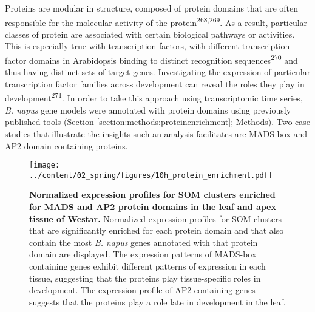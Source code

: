 \documentclass[12pt,]{book}
\begin{document}
Proteins are modular in structure, composed of protein domains that are
often responsible for the molecular activity of the
protein\textsuperscript{268,269}. As a result, particular classes of
protein are associated with certain biological pathways or activities.
This is especially true with transcription factors, with different
transcription factor domains in Arabidopsis binding to distinct
recognition sequences\textsuperscript{270} and thus having distinct sets
of target genes. Investigating the expression of particular
transcription factor families across development can reveal the roles
they play in development\textsuperscript{271}. In order to take this
approach using transcriptomic time series, \emph{B. napus} gene models
were annotated with protein domains using previously published tools
(Section \ref{section:methods:proteinenrichment}; Methods). Two case
studies that illustrate the insights such an analysis facilitates are
MADS-box and AP2 domain containing proteins.

\begin{figure}[htbp]
\centering
\texttt{[image: ../content/02\_spring/figures/10h\_protein\_enrichment.pdf]}
\caption{\textbf{Normalized expression profiles for SOM clusters
enriched for MADS and AP2 protein domains in the leaf and apex tissue of
Westar.} Normalized expression profiles for SOM clusters that are
significantly enriched for each protein domain and that also contain the
most \emph{B. napus} genes annotated with that protein domain are
displayed. The expression patterns of MADS-box containing genes exhibit
different patterns of expression in each tissue, suggesting that the
proteins play tissue-specific roles in development. The expression
profile of AP2 containing genes suggests that the proteins play a role
late in development in the leaf.}\label{figure:222:proteinsom}
\end{figure}
\end{document}
